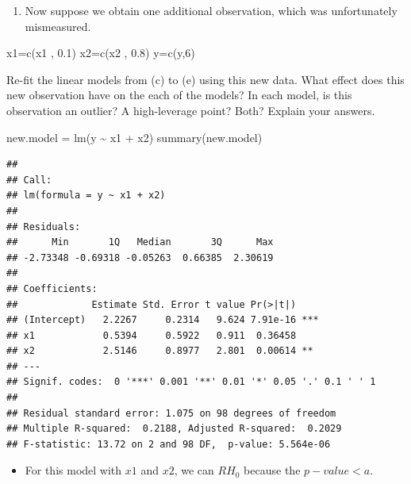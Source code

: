 \documentclass[
]{article}
\newenvironment{Shaded}{\begin{snugshade}}{\end{snugshade}}
\newcommand{\DecValTok}[1]{\textcolor[rgb]{0.00,0.00,0.81}{#1}}
\newcommand{\FloatTok}[1]{\textcolor[rgb]{0.00,0.00,0.81}{#1}}
\newcommand{\FunctionTok}[1]{\textcolor[rgb]{0.00,0.00,0.00}{#1}}
\newcommand{\NormalTok}[1]{#1}
\newcommand{\OtherTok}[1]{\textcolor[rgb]{0.56,0.35,0.01}{#1}}
\newcommand{\SpecialCharTok}[1]{\textcolor[rgb]{0.00,0.00,0.00}{#1}}
\providecommand{\tightlist}{%
  \setlength{\itemsep}{0pt}\setlength{\parskip}{0pt}}
\begin{document}
\begin{enumerate}
\def\labelenumi{(\alph{enumi})}
\setcounter{enumi}{6}
\tightlist
\item
  Now suppose we obtain one additional observation, which was
  unfortunately mismeasured.
\end{enumerate}

\begin{Shaded}
\begin{Highlighting}[]
\NormalTok{x1}\OtherTok{=}\FunctionTok{c}\NormalTok{(x1 , }\FloatTok{0.1}\NormalTok{)}
\NormalTok{x2}\OtherTok{=}\FunctionTok{c}\NormalTok{(x2 , }\FloatTok{0.8}\NormalTok{)}
\NormalTok{y}\OtherTok{=}\FunctionTok{c}\NormalTok{(y,}\DecValTok{6}\NormalTok{)}
\end{Highlighting}
\end{Shaded}

Re-fit the linear models from (c) to (e) using this new data. What
effect does this new observation have on the each of the models? In each
model, is this observation an outlier? A high-leverage point? Both?
Explain your answers.

\begin{Shaded}
\begin{Highlighting}[]
\NormalTok{new.model }\OtherTok{=} \FunctionTok{lm}\NormalTok{(y }\SpecialCharTok{\textasciitilde{}}\NormalTok{ x1 }\SpecialCharTok{+}\NormalTok{ x2)}
\FunctionTok{summary}\NormalTok{(new.model)}
\end{Highlighting}
\end{Shaded}

\begin{verbatim}
## 
## Call:
## lm(formula = y ~ x1 + x2)
## 
## Residuals:
##      Min       1Q   Median       3Q      Max 
## -2.73348 -0.69318 -0.05263  0.66385  2.30619 
## 
## Coefficients:
##             Estimate Std. Error t value Pr(>|t|)    
## (Intercept)   2.2267     0.2314   9.624 7.91e-16 ***
## x1            0.5394     0.5922   0.911  0.36458    
## x2            2.5146     0.8977   2.801  0.00614 ** 
## ---
## Signif. codes:  0 '***' 0.001 '**' 0.01 '*' 0.05 '.' 0.1 ' ' 1
## 
## Residual standard error: 1.075 on 98 degrees of freedom
## Multiple R-squared:  0.2188, Adjusted R-squared:  0.2029 
## F-statistic: 13.72 on 2 and 98 DF,  p-value: 5.564e-06
\end{verbatim}

\begin{itemize}
\tightlist
\item
  For this model with \(x1\) and \(x2\), we can \(RH_0\) because the
  \(p-value < a\).
\end{itemize}
\end{document}
